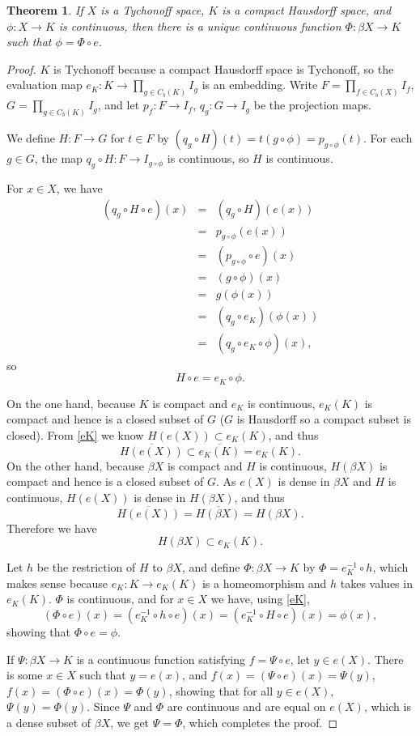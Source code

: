 \documentclass{article}
\newtheorem{theorem}{Theorem}
\theoremstyle{definition}
\begin{document}
\begin{theorem}
If $X$ is a Tychonoff space, $K$ is a compact Hausdorff space, and $\phi:X \to K$ is continuous, then there
is a unique continuous function $\Phi:\beta X \to K$ such that $\phi = \Phi \circ e$. 
\label{extend}
\end{theorem}
\begin{proof}
$K$ is Tychonoff because a compact Hausdorff space is Tychonoff, so the evaluation map $e_K:K \to \prod_{g \in C_b(K)} I_g$
is an embedding.
Write $F=\prod_{f \in C_b(X)} I_f$, $G=\prod_{g \in C_b(K)} I_g$, and let $p_f:F \to I_f$, $q_g: G \to I_g$  be the projection maps. 

We define $H:F \to G$ for 
$t \in F$ by 
 $(q_g \circ H)(t) = t(g \circ \phi)=p_{g \circ \phi}(t)$. For each $g \in G$, the map $q_g \circ H:F \to I_{g \circ \phi}$ is continuous, so $H$ is continuous.

For $x \in X$, we have 
\begin{eqnarray*}
(q_g \circ H \circ e)(x) &=&(q_g \circ H)(e(x))\\
&=&p_{g \circ \phi}(e(x))\\
& =& (p_{g \circ \phi} \circ e)(x)\\
&=&(g \circ \phi)(x)\\
& =& g(\phi(x))\\
&=&(q_g \circ e_K)(\phi(x))\\
&=&(q_g \circ e_K \circ \phi)(x),
\end{eqnarray*}
so 
\begin{equation}
H \circ e = e_K \circ \phi.
\label{eK}
\end{equation}


On the one hand,
because $K$ is compact and $e_K$ is continuous, $e_K(K)$ is compact
and hence is a closed subset of $G$ ($G$ is Hausdorff so a compact subset is closed). From 
\eqref{eK} we know $H(e(X)) \subset e_K(K)$, and thus  
\[
\overline{H(e(X))} \subset \overline{e_K(K)}=e_K(K).
\]
On the other hand,  because $\beta X$ is compact and $H$ is continuous, $H(\beta X)$ is compact and hence is a closed subset of
$G$. As
 $e(X)$ is dense in $\beta X$ and $H$ is continuous,  $H(e(X))$ is dense in $H(\beta X)$, and thus
\[
\overline{H(e(X))} = \overline{H(\beta X)} = H(\beta X).
\]
Therefore we have
\[
H(\beta X) \subset e_K(K).
\]

Let $h$ be the restriction of $H$ to $\beta X$, and define $\Phi:\beta X \to K$ by 
$\Phi = e_K^{-1} \circ h$, which makes sense because $e_K:K \to e_K(K)$ is a homeomorphism and $h$ takes values in $e_K(K)$. 
$\Phi$ is continuous, and for $x \in X$ we have, using \eqref{eK},
\[
(\Phi \circ e)(x) = (e_K^{-1} \circ h \circ e)(x) = (e_K^{-1} \circ H \circ e)(x) = \phi(x),
\]
showing that $\Phi \circ e = \phi$.

If $\Psi:\beta X \to K$ is a continuous function satisfying $f= \Psi \circ e$, let $y \in e(X)$. There is some $x \in X$ such that
$y=e(x)$, and $f(x)=(\Psi \circ e)(x)=\Psi(y)$, $f(x)=(\Phi \circ e)(x)=\Phi(y)$, showing that for all $y \in e(X)$, $\Psi(y)=\Phi(y)$. 
Since $\Psi$ and $\Phi$ are continuous and are equal on $e(X)$, which is a dense subset of $\beta X$, we get
$\Psi=\Phi$, which completes the proof.
\end{proof}
\end{document}
